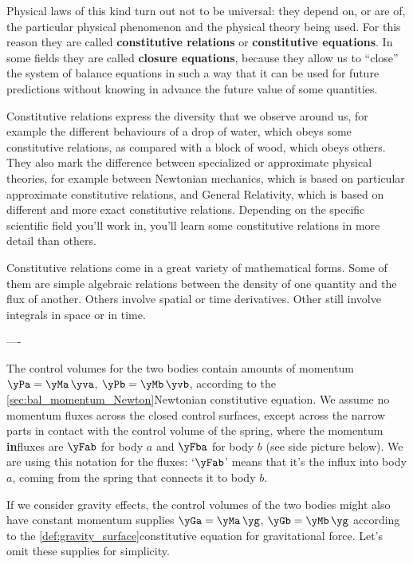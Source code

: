 Physical laws of this kind turn out not to be universal: they depend on, or are  of, the particular physical phenomenon and the physical theory being used. For this reason they are called \textbf{constitutive relations} or \textbf{constitutive equations}. In some fields they are called \textbf{closure equations}, because they allow us to \enquote{close} the system of balance equations in such a way that it can be used for future predictions without knowing in advance the future value of some quantities.

Constitutive relations express the diversity that we observe around us, for example the different behaviours of a drop of water, which obeys some constitutive relations, as compared with a block of wood, which obeys others. They also mark the difference between specialized or approximate physical theories, for example between Newtonian mechanics, which is based on particular approximate constitutive relations, and General Relativity, which is based on different and more exact constitutive relations. Depending on the specific scientific field you'll work in, you'll learn some constitutive relations in more detail than others.

Constitutive relations come in a great variety of mathematical forms. Some of them are simple algebraic relations between the density of one quantity and the flux of another. Others involve spatial or time derivatives. Other still involve integrals in space or in time.%


----

The control volumes for the two bodies contain amounts of momentum $\yPa = \yMa\,\yva$, $\yPb=\yMb\,\yvb$, according to the \autoref{sec:bal_momentum_Newton}{Newtonian constitutive equation}. We assume no momentum fluxes across the closed control surfaces, except across the narrow parts in contact with the control volume of the spring, where the momentum \textbf{in}fluxes are $\yFab$ for body $a$ and $\yFba$ for body $b$ (see side picture below). We are using this notation for the fluxes: \enquote*{$\yFab$} means that it's the influx into body $a$, coming from the spring that connects it to body $b$.

If we consider gravity effects, the control volumes of the two bodies might also have constant momentum supplies $\yGa=\yMa\,\yg$, $\yGb=\yMb\,\yg$ according to the \autoref{def:gravity_surface}{constitutive equation for gravitational force}.  Let's omit these supplies for simplicity.

